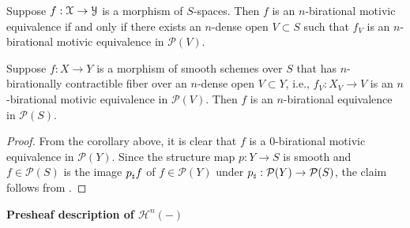 \begin{cor}
    Suppose $f:\EuScript{X}\to \EuScript{Y}$ is a morphism of $S$-spaces. Then $f$ is an $n$-birational motivic equivalence if and only if there exists an $n$-dense open $V\subset S$ such that $f_V$ is an $n$-birational motivic equivalence in $\mathcal{P}(V)$. 
\end{cor} 

\begin{cor}
    Suppose $f:X\to Y$ is a morphism of smooth schemes over $S$ that has $n$-birationally contractible fiber over an $n$-dense open $V\subset Y$, i.e., $f_V:X_V\to V$ is an $n$-birational motivic equivalence in $\mathcal{P}(V)$. Then $f$ is an $n$-birational equivalence in $\mathcal{P}(S)$.
\end{cor}
\begin{proof}
    From the corollary above, it is clear that $f$ is a $0$-birational motivic equivalence in $\mathcal{P}(Y)$. Since the structure map $p: Y\to S$ is smooth and $f\in \mathcal{P}(S)$ is the image $p_{\mathord{\text{\tiny $\sharp$}}} f$ of $f\in \mathcal{P}(Y)$ under $p_{\mathord{\text{\tiny $\sharp$}}}:\mathcal{P}(Y)\to \mathcal{P}(S)$, the claim follows from .
\end{proof}
\textbf{Presheaf description of $\mathcal{H}^{n}(-)$}

